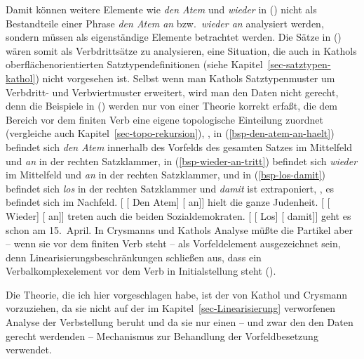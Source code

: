 Damit können weitere Elemente wie \emph{den Atem} und \emph{wieder} in () nicht als
Bestandteile einer Phrase \emph{den Atem an} bzw.\ \emph{wieder an} analysiert werden, sondern
müssen als eigenständige Elemente betrachtet werden. Die Sätze in () wären somit als
Verbdrittsätze zu analysieren, eine Situation, die auch in Kathols oberflächenorientierten
Satztypendefinitionen (siehe Kapitel~\ref{sec-satztypen-kathol}) nicht vorgesehen ist. Selbst wenn man Kathols
Satztypenmuster um Verbdritt- und Verbviertmuster erweitert, wird man den Daten nicht gerecht, denn
die Beispiele in () werden nur von einer Theorie korrekt erfaßt, die dem Bereich
vor dem finiten Verb eine eigene topologische Einteilung zuordnet (vergleiche auch Kapitel~\ref{sec-topo-rekursion}),
\dash, in (\ref{bsp-den-atem-an-haelt}) befindet sich \emph{den Atem} innerhalb des Vorfelds
des gesamten Satzes im Mittelfeld und \emph{an} in der rechten Satzklammer,
in (\ref{bsp-wieder-an-tritt}) befindet sich \emph{wieder} im Mittelfeld und \emph{an} in der rechten Satzklammer,
und in (\ref{bsp-los-damit}) befindet sich \emph{los} in der rechten Satzklammer und \emph{damit}
ist extraponiert, \dash, es befindet sich im Nachfeld.
\eal
\label{bsp-partikel+anderes+material-topo-felder}
\ex\label{bsp-den-atem-an-haelt-zwei}
{}[ [ Den Atem] [ an]] hielt die ganze Judenheit.
\ex\label{bsp-wieder-an-tritt-zwei}
{}[ [ Wieder] [ an]] treten auch die beiden Sozialdemokraten.
\ex\label{bsp-los-damit-zwei}
{}[ [ Los] [ damit]] geht es schon am 15.\ April.
\zl
In Crysmanns und Kathols Analyse müßte die Partikel aber -- wenn sie vor dem finiten Verb
steht -- als Vorfeldelement ausgezeichnet sein, denn Linearisierungsbeschränkungen schließen
aus, dass ein Verbalkomplexelement vor dem Verb in Initialstellung steht (\citealp[]{Crysmann2002a}).%

Die Theorie, die ich hier vorgeschlagen habe, ist der von Kathol und Crysmann vorzuziehen,
da sie nicht auf der im Kapitel~\ref{sec-Linearisierung} verworfenen Analyse der Verbstellung 
beruht und da sie nur einen -- und zwar den den Daten gerecht werdenden -- 
Mechanismus zur Behandlung der Vorfeldbesetzung verwendet.

